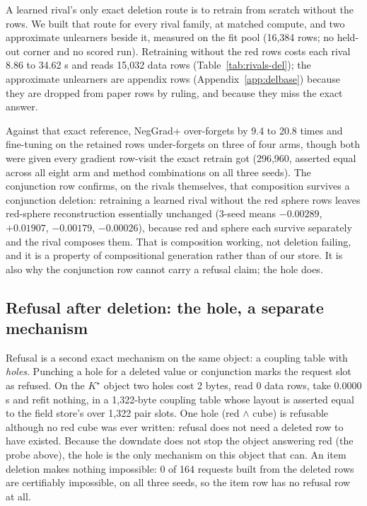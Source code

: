 \documentclass{article}
\newcommand{\Kstar}{\ensuremath{K^{\star}}}
\begin{document}
A learned rival's only exact deletion route is to retrain from scratch without the rows. We
built that route for every rival family, at matched compute, and two approximate unlearners
beside it, measured on the fit pool (16,384 rows; no held-out corner and no scored run).
Retraining without the red rows costs each rival 8.86 to 34.62 s and reads 15,032 data rows
(Table~\ref{tab:rivals-del}); the approximate unlearners are appendix rows
(Appendix~\ref{app:delbase}) because they are dropped from paper rows by ruling, and because
they miss the exact answer.

\noindent Against that exact reference, NegGrad+ over-forgets by 9.4 to 20.8 times and
fine-tuning on the retained rows under-forgets on three of four arms, though both were given
every gradient row-visit the exact retrain got (296,960, asserted equal across all eight arm
and method combinations on all three seeds).
The conjunction row confirms, on the rivals themselves, that composition survives a
conjunction deletion: retraining a learned rival without the red sphere rows leaves red-sphere
reconstruction essentially unchanged (3-seed means $-0.00289$, $+0.01907$, $-0.00179$,
$-0.00026$), because red and sphere each survive separately and the rival composes them.
That is composition working, not deletion failing, and it is a property of compositional
generation rather than of our store. It is also why the conjunction row cannot carry a
refusal claim; the hole does.

\subsection{Refusal after deletion: the hole, a separate mechanism}
\label{sec:hole}

Refusal is a second exact mechanism on the same object: a coupling table with \emph{holes}.
Punching a hole for a deleted value or conjunction marks the request slot as refused. On the
$\Kstar$ object two holes cost 2 bytes, read 0 data rows, take 0.0000 s and refit nothing, in
a 1,322-byte coupling table whose layout is asserted equal to the field store's over 1,322 pair
slots.
One hole (red $\wedge$ cube) is refusable although no red cube was ever written: refusal does
not need a deleted row to have existed.
Because the downdate does not stop the object answering red (the probe above), the hole is the
only mechanism on this object that can. An item deletion makes nothing impossible: 0 of 164
requests built from the deleted rows are certifiably impossible, on all three seeds, so the
item row has no refusal row at all.
\end{document}
